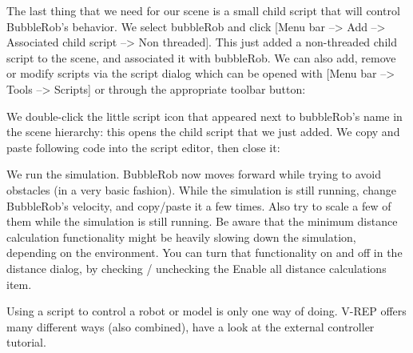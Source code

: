 The last thing that we need for our scene is a small child script that will
control BubbleRob's behavior. We select bubbleRob and click [Menu bar --> 
Add --> Associated child script --> Non threaded]. This just added a 
non-threaded child script to the scene, and associated it with bubbleRob. 
We can also add, remove or modify scripts via the script dialog which can
be opened with [Menu bar --> Tools --> Scripts] or through the appropriate
toolbar button:


We double-click the little script icon that appeared next to bubbleRob's 
name in the scene hierarchy: this opens the child script that we just added. 
We copy and paste following code into the script editor, then close it:


We run the simulation. BubbleRob now moves forward while trying to avoid 
obstacles (in a very basic fashion). While the simulation is still running,
change BubbleRob's velocity, and copy/paste it a few times. Also try to 
scale a few of them while the simulation is still running. Be aware that 
the minimum distance calculation functionality might be heavily slowing
down the simulation, depending on the environment. You can turn that 
functionality on and off in the distance dialog, by checking / unchecking
the Enable all distance calculations item.

Using a script to control a robot or model is only one way of doing. 
V-REP offers many different ways (also combined), have a look at the 
external controller tutorial.
